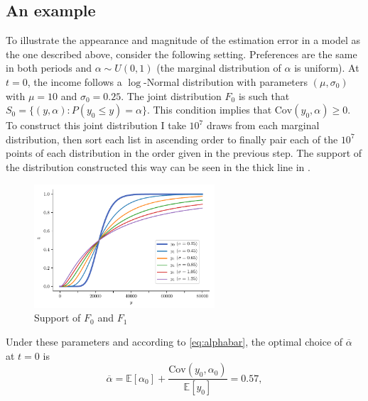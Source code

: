 \documentclass[english, a4paper, 12pt]{article}
\begin{document}
\subsection{An example} \label{ssec:RAexample}
To illustrate the appearance and magnitude of the estimation error in a model as the one described above, consider the following setting. Preferences are the same in both periods and $\alpha \sim U(0,1)$ (the marginal distribution of $\alpha$ is uniform). At $t = 0$, the income follows a $\log$-Normal distribution with parameters $(\mu, \sigma_{0})$ with $\mu = 10$ and $\sigma_{0} = 0.25$. The joint distribution $F_{0}$ is such that $S_{0} = \{(y,\alpha) : P(y_{0} \leq y) = \alpha\}$. This condition implies that $\mathrm{Cov}(y_{0}, \alpha) \geq 0$. To construct this joint distribution I take  $10^{7}$ draws from each marginal distribution, then sort each list in ascending order to finally pair each of the $10^{7}$ points of each distribution in the order given in the previous step. The support of the distribution constructed this way can be seen in the thick line in . 
\vfill
	\begin{figure}[H]
		\caption{Support of $F_{0}$ and $F_{1}$}
		\label{fig:JointDistributions}
		\includegraphics[width = 0.6\textwidth]{RAjointDistribs}
		\vspace{-1ex}
	\end{figure}
\vfill
\newpage
Under these parameters and according to \eqref{eq:alphabar}, the optimal choice of $\overline{\alpha}$ at $t = 0$ is
	\begin{equation} \label{eq:exAlphaBar}
		\overline{\alpha} 
			= \mathbb{E}[\alpha_{0}] + \frac{\mathrm{Cov}(y_{0}, \alpha_{0})}{\mathbb{E}[y_{0}]}
			= 0.57,
	\end{equation}
\end{document}
